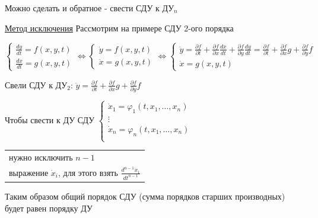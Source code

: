 \documentclass[12pt]{article}
\begin{document}
    Можно сделать и обратное - свести СДУ к ДУ$_n$

    \underline{Метод исключения} Рассмотрим на примере СДУ 2-ого порядка

    $\begin{cases}
         \frac{dy}{dt} = f(x, y, t) \\
         \frac{dx}{dt} = g(x, y, t)
    \end{cases} \Longleftrightarrow \begin{cases}
         \dot{y} = f(x, y, t) \\
         \dot{x} = g(x, y, t)
    \end{cases} \Longleftrightarrow \begin{cases}
         \ddot y = \frac{\partial f}{\partial t} + \frac{\partial f}{\partial x}\frac{dx}{dt} + \frac{\partial f}{\partial y}\frac{dy}{dt} = \frac{\partial f}{\partial t} + \frac{\partial f}{\partial x}g + \frac{\partial f}{\partial y}f \\
         \dot{x} = g(x, y, t)
    \end{cases}$

    Свели СДУ к ДУ$_2$: $\ddot y = \frac{\partial f}{\partial t} + \frac{\partial f}{\partial x}g + \frac{\partial f}{\partial y}f$

    \Nota Чтобы свести к ДУ СДУ $\begin{cases}
         \dot x_1 = \varphi_1(t, x_1, \dots, x_n) \\
         \vdots \\
         \dot x_n = \varphi_n(t, x_1, \dots, x_n) \\
    \end{cases}$ \begin{tabular}{l}\\ нужно исключить $n - 1$ \\ выражение $\dot x_i$, для этого взять $\frac{d^{n - 1} \dot x_1}{dt^{n - 1}}$\end{tabular}

    Таким образом общий порядок СДУ (сумма порядков старших производных) будет равен порядку ДУ
\end{document}
